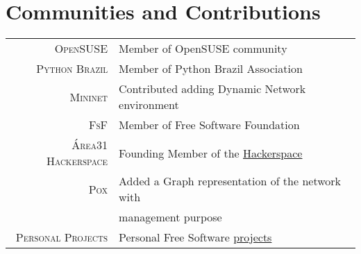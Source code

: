 \documentclass[a4paper,10pt]{article} %
\begin{document}

\section{Communities and Contributions}

\begin{tabular}{rl}
\textsc{OpenSUSE}  & Member of OpenSUSE community \\
\textsc{Python Brazil}  & Member of Python Brazil Association \\
\textsc{Mininet}  & Contributed adding Dynamic Network environment \\
\textsc{FsF} & Member of Free Software Foundation \\
\textsc{Área31 Hackerspace} & Founding Member of the
\href{http://area31.net.br}{Hackerspace} \\
\textsc{Pox} & Added a Graph representation of the network with 
\\ & management purpose \\
\textsc{Personal Projects} & Personal Free Software
\href{http://github.com/pantuza}{projects} \\
\end{tabular}












\end{document}
